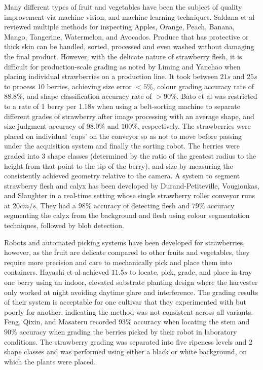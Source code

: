 \documentclass[conference]{IEEEtran}
\begin{document}
Many different types of fruit and vegetables have been the subject of quality improvement via machine vision, and machine learning techniques. Saldana et al \cite{saldana} reviewed multiple methods for inspecting Apples, Orange, Peach, Banana, Mango, Tangerine, Watermelon, and Avocados. Produce that has protective or thick skin can be handled, sorted, processed and even washed without damaging the final product. However, with the delicate nature of strawberry flesh, it is difficult for production-scale grading as noted by Liming and Yanchao \cite{liming} when placing individual strawberries on a production line. It took between $21s$ and $25s$ to process 10 berries, achieving size error $<5\%$, colour grading accuracy rate of $88.8\%$, and shape classification accuracy rate of $>90\%$. Bato et al \cite{bato} was restricted to a rate of 1 berry per 1.18$s$ when using a belt-sorting machine to separate different grades of strawberry after image processing with an average shape, and size judgment accuracy of $98.0\%$ and $100\%$, respectively. The strawberries were placed on individual 'cups' on the conveyor so as not to move before passing under the acquisition system and finally the sorting robot. The berries were graded into 3 shape classes (determined by the ratio of the greatest radius to the height from that point to the tip of the berry), and size by measuring the consistently achieved geometry relative to the camera. A system to segment strawberry flesh and calyx has been developed by Durand-Petiteville, Vougioukas, and Slaughter \cite{durand} in a real-time setting whose single strawberry roller conveyor runs at 20$cm/s$. They had a $98\%$ accuracy of detecting flesh and $79\%$ accuracy segmenting the calyx from the background and flesh using colour segmentation techniques, followed by blob detection.

Robots and automated picking systems have been developed for strawberries, however, as the fruit are delicate compared to other fruits and vegetables, they require more precision and care to mechanically pick and place them into containers. Hayashi et al \cite{hayashi} achieved $11.5s$ to locate, pick, grade, and place in tray one berry using an indoor, elevated substrate planting design where the harvester only worked at night avoiding daytime glare and interference. The grading results of their system is acceptable for one cultivar that they experimented with but poorly for another, indicating the method was not consistent across all variants. Feng, Qixin, and Masateru \cite{feng} recorded $93\%$ accuracy when locating the stem and $90\%$ accuracy when grading the berries picked by their robot in laboratory conditions. The strawberry grading was separated into five ripeness levels and 2 shape classes and was performed using either a black or white background, on which the plants were placed. 
\end{document}
